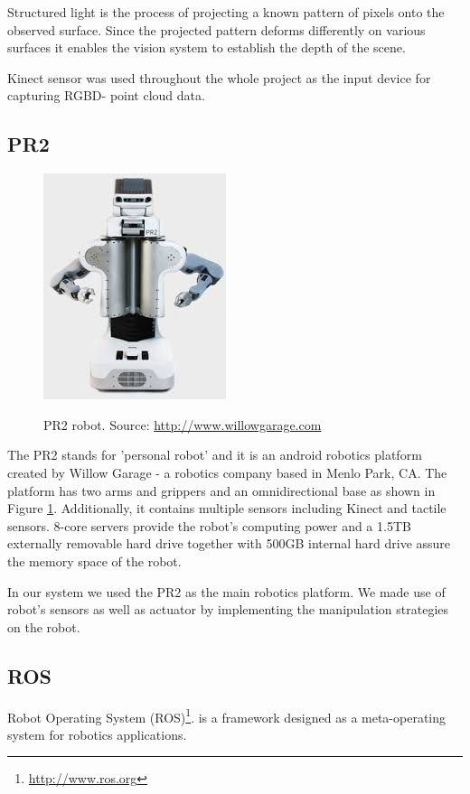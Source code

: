 Structured light is the process of projecting a known pattern of pixels onto the observed surface. Since the projected pattern deforms differently on various surfaces it enables  the vision system to establish the depth of the scene.

Kinect sensor was used throughout the whole project as the input device for capturing RGBD- point cloud  data.

\subsection{PR2}

\begin{figure}
\centering

{\includegraphics[width=0.5\columnwidth]{figures/pr2.jpeg}}

\caption{PR2 robot. Source: \url{http://www.willowgarage.com}}
\label{fig:pr2}
\end{figure}

The PR2 stands for 'personal robot' and it is an android robotics platform created by Willow Garage - a robotics company based in Menlo Park, CA. The platform has two arms and grippers and an omnidirectional base as shown in Figure \ref{fig:pr2}. Additionally, it contains multiple sensors including Kinect and tactile sensors. 8-core servers provide the robot's computing power and a 1.5TB externally removable hard drive together with 500GB internal hard drive assure the memory space of the robot.  

In our system we used the PR2 as the main robotics platform. We made use of robot's sensors as well as actuator by implementing the manipulation strategies on the robot.

\subsection{ROS}
Robot Operating System (ROS)\footnote{\url{http://www.ros.org}}. is a framework designed as a meta-operating system for robotics applications. 

